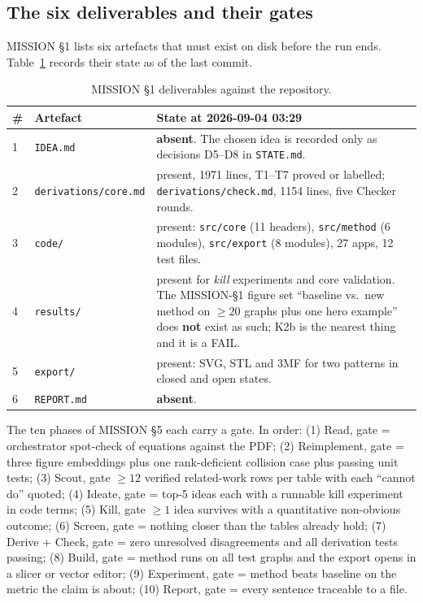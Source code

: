 \documentclass[10pt,a4paper]{article}
\newcommand{\fn}[1]{\nolinkurl{#1}}
\begin{document}
\subsection{The six deliverables and their gates}

MISSION \S1 lists six artefacts that must exist on disk before the run ends.
Table~\ref{tab:deliverables} records their state as of the last commit.

\begin{table}[h]
\centering
\small
\begin{tabular}{@{}llp{88mm}@{}}
\toprule
\# & Artefact & State at 2026-09-04 03:29 \\
\midrule
1 & \fn{IDEA.md} & \textbf{absent}. The chosen idea is recorded only as decisions D5--D8 in \fn{STATE.md}. \\
2 & \fn{derivations/core.md} & present, 1971 lines, T1--T7 proved or labelled; \fn{derivations/check.md}, 1154 lines, five Checker rounds. \\
3 & \fn{code/} & present: \fn{src/core} (11 headers), \fn{src/method} (6 modules), \fn{src/export} (8 modules), 27 apps, 12 test files. \\
4 & \fn{results/} & present for \emph{kill} experiments and core validation. The MISSION-\S1 figure set ``baseline vs.\ new method on $\ge 20$ graphs plus one hero example'' does \textbf{not} exist as such; K2b is the nearest thing and it is a FAIL. \\
5 & \fn{export/} & present: SVG, STL and 3MF for two patterns in closed and open states. \\
6 & \fn{REPORT.md} & \textbf{absent}. \\
\bottomrule
\end{tabular}
\caption{MISSION \S1 deliverables against the repository.}
\label{tab:deliverables}
\end{table}

The ten phases of MISSION \S5 each carry a gate. In order: (1) Read, gate = orchestrator
spot-check of equations against the PDF; (2) Reimplement, gate = three figure embeddings plus
one rank-deficient collision case plus passing unit tests; (3) Scout, gate $\ge 12$ verified
related-work rows per table with each ``cannot do'' quoted; (4) Ideate, gate = top-5 ideas each
with a runnable kill experiment in code terms; (5) Kill, gate $\ge 1$ idea survives with a
quantitative non-obvious outcome; (6) Screen, gate = nothing closer than the tables already
hold; (7) Derive + Check, gate = zero unresolved disagreements and all derivation tests
passing; (8) Build, gate = method runs on all test graphs and the export opens in a slicer or
vector editor; (9) Experiment, gate = method beats baseline on the metric the claim is about;
(10) Report, gate = every sentence traceable to a file.
\end{document}
